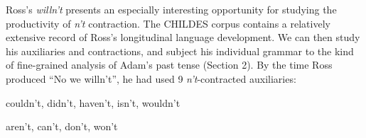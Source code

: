 \documentclass[output=paper,
modfonts
]{LSP/langsci}
\begin{document}

Ross's \textit{willn't} presents an especially interesting opportunity
for studying the productivity of \textit{n't} 
contraction. The CHILDES corpus 
 contains a relatively extensive record of Ross's longitudinal
 language development. We can then study his auxiliaries and
 contractions, and subject his individual grammar to the kind of fine-grained analysis of Adam's past tense (Section 2). By the
 time Ross produced ``No we willn't'', he had used 9 \textit{n't}-contracted auxiliaries:
\begin{exe} \ex \label{Ross}
\begin{xlist} 
\item couldn't, didn't, haven't, isn't, wouldn't \label{rossa}
\item aren't, can't, don't, won't \label{rossb} \end{xlist} \end{exe}
\end{document}

